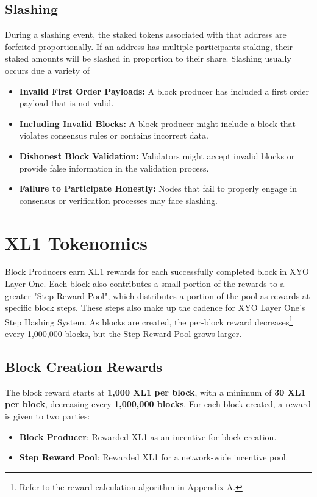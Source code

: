 \documentclass{article}
\begin{document}
\subsection{Slashing}
During a slashing event, the staked tokens associated with that address are
forfeited proportionally. If an address has multiple participants staking,
their staked amounts will be slashed in proportion to their share. Slashing
usually occurs due a variety of
\begin{itemize}
    \item \textbf{Invalid First Order Payloads:} A block producer has included a first order payload that is not valid.
    \item \textbf{Including Invalid Blocks:} A block producer might include a block that violates consensus rules or contains incorrect data.
    \item \textbf{Dishonest Block Validation:} Validators might accept invalid blocks or provide false information in the validation process.
    \item \textbf{Failure to Participate Honestly:} Nodes that fail to properly engage in consensus or verification processes may face slashing.
\end{itemize}

\section{XL1 Tokenomics}
Block Producers earn XL1 rewards for each successfully completed block in XYO
Layer One. Each block also contributes a small portion of the rewards to a
greater "Step Reward Pool", which distributes a portion of the pool as rewards
at specific block steps. These steps also make up the cadence for XYO Layer
One's Step Hashing System. As blocks are created, the per-block reward
decreases\footnote{Refer to the reward calculation algorithm in Appendix A.}
every 1,000,000 blocks, but the Step Reward Pool grows larger.

\subsection{Block Creation Rewards}
The block reward starts at \textbf{1,000 XL1 per block}, with a minimum of
\textbf{30 XL1 per block}, decreasing every \textbf{1,000,000 blocks}. For
each block created, a reward is given to two parties:
\begin{itemize}
    \item \textbf{Block Producer}: Rewarded XL1 as an incentive for block creation.
    \item \textbf{Step Reward Pool}: Rewarded XL1 for a network-wide incentive pool.
\end{itemize}
\end{document}
